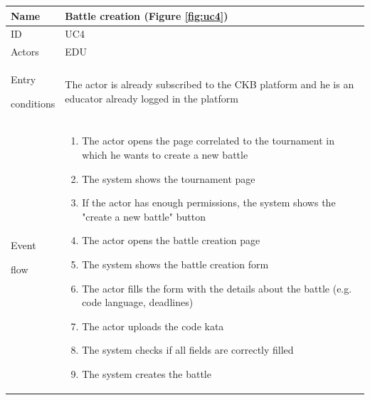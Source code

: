 \begin{center}
    \def\arraystretch{1.5}
    \begin{tabular}{| m{2cm} | m{10cm}|}
        \hline
        Name                  & Battle creation  (Figure \ref{fig:uc4})                                                                                                               \\ \hline
        ID                    & UC4                                                                                                                             \\ \hline
        Actors                & EDU                                                                                                                             \\ \hline
        Entry \par conditions & The actor is already subscribed to the CKB platform and he is an educator already logged in the platform                        \\ \hline
        Event \par flow       & \begin{enumerate}
                                    \item The actor opens the page correlated to the tournament in which he wants to create a new battle
                                    \item The system shows the tournament page
                                    \item If the actor has enough permissions, the system shows the "create a new battle" button
                                    \item The actor opens the battle creation page
                                    \item The system shows the battle creation form
                                    \item The actor fills the form with the details about the battle (e.g. code language, deadlines)
                                    \item The actor uploads the code kata
                                    \item The system checks if all fields are correctly filled
                                    \item The system creates the battle
                                \end{enumerate}                             \\ \hline

\end{tabular}
\end{center}
